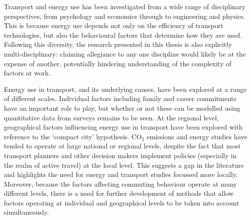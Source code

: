 Transport and energy use has been investigated from a wide range of disciplinary
perspectives, from psychology and economics through to engineering and physics.
This is because energy use depends not only on the efficiency of transport
technologies, but also the behavioural factors that determine how they are used.
Following this diversity, the research presented in this thesis is also
explicitly multi-disciplinary: claiming allegiance to any one discipline
would likely be at the expense of another, potentially 
hindering understanding of the complexity of factors at work.

Energy use in transport, and its underlying causes, have been explored at a
range of different scales. Individual factors including family
and career commitments have an important role to play, but whether or not
these can be modelled using quantitative data from surveys remains to be seen.
At the regional level, geographical factors influencing energy use in transport
have been explored with reference to the `compact city' hypothesis. CO$_2$
emissions and energy studies have tended to operate at large national or
regional levels, despite the fact that most transport planners and other decision
makers implement policies (especially in the realm of active travel) at the
local level. This suggests a gap in the literature and highlights the need
for energy and transport studies focussed more locally. Moreover,
because the factors affecting commuting behaviour operate at many different levels,
there is a need for further development of methods that allow factors operating
at individual and geographical levels to be taken into account simultaneously.








